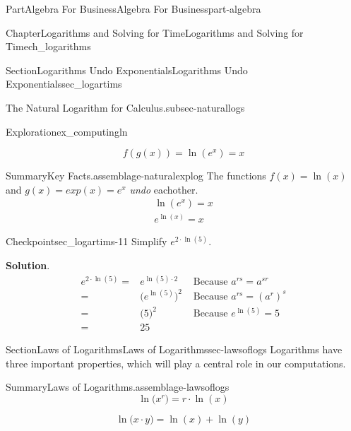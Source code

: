 \documentclass{tufte-book}
\newcommand{\blocktitlefont}{\relax}
\numberwithin{equation}{chapter}
\newcommand{\amp}{&}
\begin{document}
\begin{partptx}{Part}{Algebra For Business}{}{Algebra For Business}{}{}{part-algebra}
\begin{chapterptx}{Chapter}{Logarithms and Solving for Time}{}{Logarithms and Solving for Time}{}{}{ch_logarithms}
\begin{sectionptx}{Section}{Logarithms Undo Exponentials}{}{Logarithms Undo Exponentials}{}{}{sec_logartims}
\begin{paragraphs}{The Natural Logarithm for Calculus.}{subsec-naturallogs}
\begin{exploration}{Exploration}{}{ex_computingln}
\begin{enumerate}[font=\bfseries,label=(\alph*),ref=\alph*]
\begin{equation*}
\end{equation*}
%
\begin{equation*}
f(g(x)) = \ln(e^{x}) = x
\end{equation*}
%
\end{enumerate}%
\end{exploration}%
\begin{assemblage}{Summary}{Key Facts.}{assemblage-naturalexplog}%
The functions \(f(x) = \ln(x)\) and \(g(x) = exp(x) = e^x\) \emph{undo} eachother.%
\begin{gather*}
\ln\left(e^x\right) = x \\
e^{\ln(x)} = x 
\end{gather*}
%
\end{assemblage}
\end{paragraphs}%
\begin{inlineexercise}{Checkpoint}{}{sec_logartims-11}%
Simplify \(e^{2\cdot \ln(5)}\).%
\par\smallskip%
\noindent\textbf{\blocktitlefont Solution}.\hypertarget{sec_logartims-11-2}{}\quad{}%
\begin{align*}
e^{2\cdot \ln(5)} = \amp e^{\ln(5)\cdot 2}      
\amp \text{ Because } a^{rs} = a^{sr}    \\
= \amp \Big(e^{\ln(5)}\Big)^2
\amp \text{ Because } a^{rs} = (a^r)^{s} \\
= \amp \Big(5\Big)^2         
\amp  \text{ Because } e^{\ln(5)} = 5     \\
= \amp 25                     
\amp 
\end{align*}
%
\end{inlineexercise}%
\end{sectionptx}
%
%
\typeout{************************************************}
\typeout{************************************************}
%
\begin{sectionptx}{Section}{Laws of Logarithms}{}{Laws of Logarithms}{}{}{sec-lawsoflogs}
Logarithms have three important properties, which will play a central role in our computations.%
\begin{assemblage}{Summary}{Laws of Logarithms.}{assemblage-lawsoflogs}%
%
\begin{equation*}
\ln\Big( x^r \Big)= r\cdot \ln(x)
\end{equation*}
%
\par
%
\begin{equation*}
\ln\Big( x\cdot y \Big)= \ln(x) + \ln(y)
\end{equation*}
%
\par

\end{assemblage}
\end{sectionptx}
\end{chapterptx}
\end{partptx}
\end{document}
